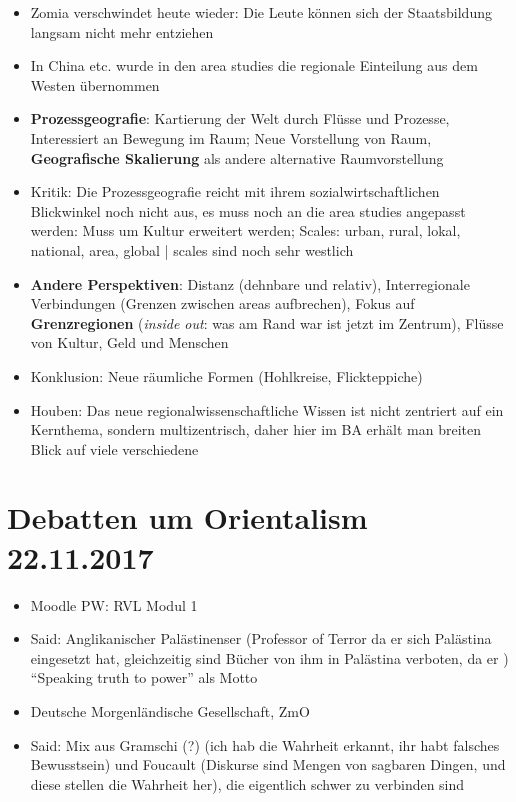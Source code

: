 \documentclass[emulatestandardclasses]{scrartcl}
\begin{document}
\begin{itemize}
  \item Zomia verschwindet heute wieder: Die Leute können sich der Staatsbildung langsam nicht mehr entziehen
  \item In China etc. wurde in den area studies die regionale Einteilung aus dem Westen übernommen
  \item \textbf{Prozessgeografie}: Kartierung der Welt durch Flüsse und Prozesse, Interessiert an Bewegung im Raum; Neue Vorstellung von Raum, \textbf{Geografische Skalierung} als andere alternative Raumvorstellung
  \item Kritik: Die Prozessgeografie reicht mit ihrem sozialwirtschaftlichen Blickwinkel noch nicht aus, es muss noch an die area studies angepasst werden: Muss um Kultur erweitert werden; Scales: urban, rural, lokal, national, area, global | scales sind noch sehr westlich 
  \item \textbf{Andere Perspektiven}: Distanz (dehnbare und relativ), Interregionale Verbindungen (Grenzen zwischen areas aufbrechen), Fokus auf \textbf{Grenzregionen} (\emph{inside out}: was am Rand war ist jetzt im Zentrum), Flüsse von Kultur, Geld und Menschen
  \item Konklusion: Neue räumliche Formen (Hohlkreise, Flickteppiche)
  \item Houben: Das neue regionalwissenschaftliche Wissen ist nicht zentriert auf ein Kernthema, sondern multizentrisch, daher hier im BA erhält man breiten Blick auf viele verschiedene
\end{itemize}

\section{Debatten um Orientalism\\22.11.2017}

\begin{itemize}
  \item Moodle PW: RVL Modul 1
  \item Said: Anglikanischer Palästinenser (Professor of Terror da er sich Palästina eingesetzt hat, gleichzeitig sind Bücher von ihm in Palästina verboten, da er ) "`Speaking truth to power"' als Motto
  \item Deutsche Morgenländische Gesellschaft, ZmO
  \item Said: Mix aus Gramschi (?) (ich hab die Wahrheit erkannt, ihr habt falsches Bewusstsein) und Foucault (Diskurse sind Mengen von sagbaren Dingen, und diese stellen die Wahrheit her), die eigentlich schwer zu verbinden sind
\end{itemize}
\end{document}
